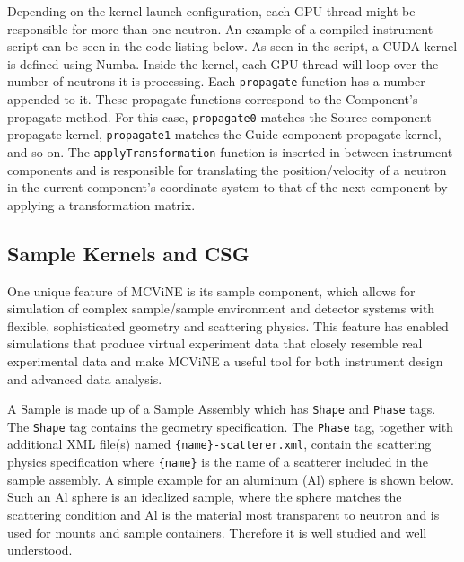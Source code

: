 Depending on the kernel launch configuration, each GPU thread might be responsible for more than one neutron. An example of a compiled instrument script can be seen in the code listing below. As seen in the script, a CUDA kernel is defined using Numba. Inside the kernel, each GPU thread will loop over the number of neutrons it is processing. Each \texttt{propagate} function has a number appended to it. These propagate functions correspond to the Component's propagate method. For this case, \texttt{propagate0} matches the Source component propagate kernel, \texttt{propagate1} matches the Guide component propagate kernel, and so on. The \texttt{applyTransformation} function is inserted in-between instrument components and is responsible for translating the position/velocity of a neutron in the current component's coordinate system to that of the next component by applying a transformation matrix.

\vspace{1mm}

\vspace{1mm}

\subsection{Sample Kernels and CSG}

One unique feature of MCViNE is its sample component, which allows for simulation of complex sample/sample environment and detector systems with flexible, sophisticated geometry and scattering physics.
This feature has enabled simulations that produce virtual experiment data that closely resemble real experimental data and make MCViNE a useful tool for both instrument design and advanced data analysis.

A Sample is made up of a Sample Assembly which has \texttt{Shape} and \texttt{Phase} tags.
The \texttt{Shape} tag contains the geometry specification. The \texttt{Phase} tag, together with additional XML file(s) named \texttt{\{name\}-scatterer.xml}, contain the scattering physics specification where \texttt{\{name\}} is the name of a scatterer included in the sample assembly.
A simple example for an aluminum (Al) sphere is shown below.
Such an Al sphere is an idealized sample, where the sphere matches the scattering condition and Al is the material most transparent to neutron and is used for mounts and sample containers. Therefore it is well studied and well understood.

\vspace{1mm}

\vspace{1mm}


